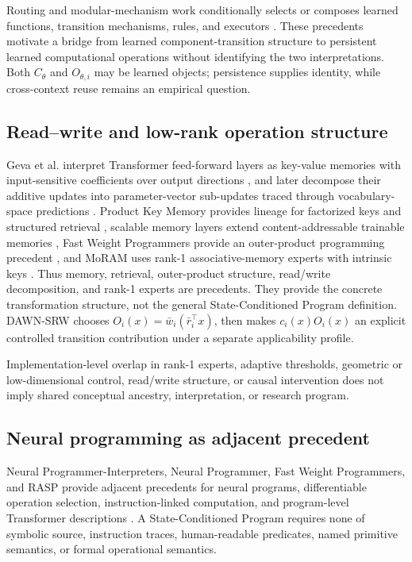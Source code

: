 \documentclass{article}
\newcommand{\DAWN}{DAWN-SRW}
\begin{document}
Routing and modular-mechanism work conditionally selects or composes learned
functions, transition mechanisms, rules, and executors
\cite{rosenbaum2018routing,cases2019recursive,goyal2021rim,
goyal2021factorizing,didolkar2021neural,nguyen2023reusable,
rahaman2021dynamic,weiss2022neural}. These precedents motivate a bridge from
learned component-transition structure to persistent learned computational
operations without identifying the two interpretations. Both \(C_\theta\) and
\(O_{\theta,i}\) may be learned objects; persistence supplies identity, while
cross-context reuse remains an empirical question.

\subsection{Read--write and low-rank operation structure}

Geva et al. interpret Transformer feed-forward layers as key-value memories with
input-sensitive coefficients over output directions
\cite{geva2021transformer}, and later decompose their additive updates into
parameter-vector sub-updates traced through vocabulary-space predictions
\cite{geva2022transformer}. Product Key Memory provides lineage for factorized
keys and structured retrieval \cite{lample2019large}, scalable memory layers
extend content-addressable trainable memories \cite{berges2024memory}, Fast
Weight Programmers provide an outer-product programming precedent
\cite{schlag2021linear}, and MoRAM uses rank-1 associative-memory experts with
intrinsic keys \cite{lu2026little}. Thus memory, retrieval, outer-product
structure, read/write decomposition, and rank-1 experts are precedents. They
provide the concrete transformation structure, not the general State-Conditioned
Program definition. \DAWN{} chooses
\(O_i(x)=\bar w_i(\bar r_i^\top x)\), then makes \(c_i(x)O_i(x)\) an explicit
controlled transition contribution under a separate applicability profile.

Implementation-level overlap in rank-1 experts, adaptive thresholds, geometric or
low-dimensional control, read/write structure, or causal intervention does not
imply shared conceptual ancestry, interpretation, or research program.

\subsection{Neural programming as adjacent precedent}

Neural Programmer-Interpreters, Neural Programmer, Fast Weight Programmers, and
RASP provide adjacent precedents for neural programs, differentiable operation
selection, instruction-linked computation, and program-level Transformer
descriptions \cite{reed2016npi,neelakantan2016neuralprogrammer,
schlag2021linear,weiss2021thinking}. A State-Conditioned Program requires none of
symbolic source, instruction traces, human-readable predicates, named primitive
semantics, or formal operational semantics.
\end{document}
